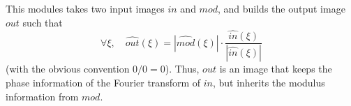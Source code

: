 This modules takes two input images $in$ and $mod$, and builds the
output image $out$ such that
$$\forall \xi, \quad
\widehat{out}(\xi) = |\widehat{mod}(\xi)|\cdot 
\frac{\widehat{in}(\xi)}{|\widehat{in}(\xi)|}$$
(with the obvious convention $0/0=0$).
Thus, $out$ is an image that keeps the phase information of the Fourier
transform of $in$, but inherits the modulus information from $mod$.
